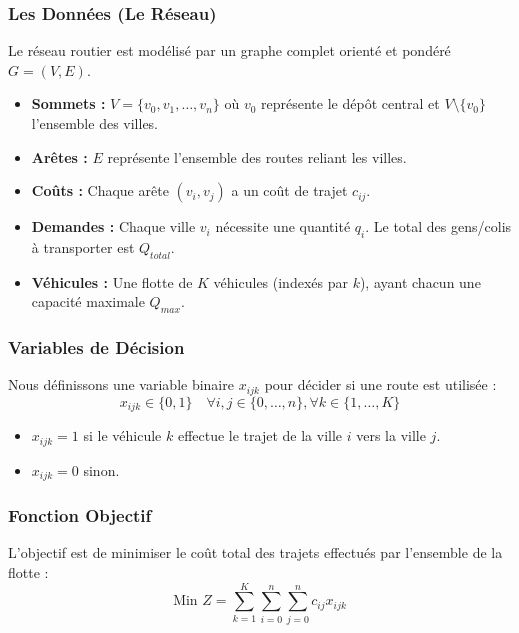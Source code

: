 \subsubsection*{Les Données (Le Réseau)}
{}

Le réseau routier est modélisé par un graphe complet orienté et pondéré $G = (V, E)$.
\begin{itemize}
    \item \textbf{Sommets :} $V = \{v_0, v_1, \dots, v_n\}$ où $v_0$ représente le dépôt central et $V \setminus \{v_0\}$ l'ensemble des villes.
    \item \textbf{Arêtes :} $E$ représente l'ensemble des routes reliant les villes.
    \item \textbf{Coûts :} Chaque arête $(v_i, v_j)$ a un coût de trajet $c_{ij}$.
    \item \textbf{Demandes :} Chaque ville $v_i$ nécessite une quantité $q_i$. Le total des gens/colis à transporter est $Q_{total}$.
    \item \textbf{Véhicules :} Une flotte de $K$ véhicules (indexés par $k$), ayant chacun une capacité maximale $Q_{max}$.
\end{itemize}

\subsubsection*{Variables de Décision}
{}

Nous définissons une variable binaire $x_{ijk}$ pour décider si une route est utilisée :
$$x_{ijk} \in \{0, 1\} \quad \forall i,j \in \{0, \dots, n\}, \forall k \in \{1, \dots, K\}$$
\begin{itemize}
    \item $x_{ijk} = 1$ si le véhicule $k$ effectue le trajet de la ville $i$ vers la ville $j$.
    \item $x_{ijk} = 0$ sinon.
\end{itemize}

\subsubsection*{Fonction Objectif}
{}

L'objectif est de minimiser le coût total des trajets effectués par l'ensemble de la flotte :
$$\text{Min } Z = \sum_{k=1}^{K} \sum_{i=0}^{n} \sum_{j=0}^{n} c_{ij} x_{ijk}$$

